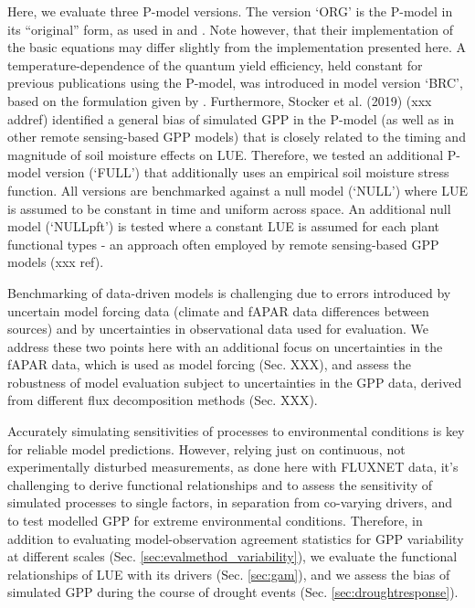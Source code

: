 \documentclass{myreport}
\begin{document}
Here, we evaluate three P-model versions. The version `ORG' is the P-model in its ``original'' form, as used in \cite{wang17natpl} and \cite{keenan17natcomm}. Note however, that their implementation of the basic equations may differ slightly from the implementation presented here. A temperature-dependence of the quantum yield efficiency, held constant for previous publications using the P-model, was introduced in model version `BRC', based on the formulation given by \cite{bernacchi03pce}. Furthermore, Stocker et al. (2019) (xxx addref) identified a general bias of simulated GPP in the P-model (as well as in other remote sensing-based GPP models) that is closely related to the timing and magnitude of soil moisture effects on LUE. Therefore, we tested an additional P-model version (`FULL') that additionally uses an empirical soil moisture stress function. All versions are benchmarked against a null model (`NULL') where LUE is assumed to be constant in time and uniform across space. An additional null model (`NULLpft') is tested where a constant LUE is assumed for each plant functional types - an approach often employed by remote sensing-based GPP models (xxx ref).

Benchmarking of data-driven models is challenging due to errors introduced by uncertain model forcing data \citep{ryu19rse} (climate and fAPAR data differences between sources) and by uncertainties in observational data used for evaluation. We address these two points here with an additional focus on uncertainties in the fAPAR data, which is used as model forcing (Sec. XXX), and assess the robustness of model evaluation subject to uncertainties in the GPP data, derived from different flux decomposition methods (Sec. XXX). 

Accurately simulating sensitivities of processes to environmental conditions is key for reliable model predictions. However, relying just on continuous, not experimentally disturbed measurements, as done here with FLUXNET data, it's challenging to derive functional relationships and to assess the sensitivity of simulated processes to single factors, in separation from co-varying drivers, and to test modelled GPP for extreme environmental conditions. Therefore, in addition to evaluating model-observation agreement statistics for GPP variability at different scales (Sec. \ref{sec:evalmethod_variability}), we evaluate the functional relationships of LUE with its drivers (Sec. \ref{sec:gam}), and we assess the bias of simulated GPP during the course of drought events (Sec. \ref{sec:droughtresponse}).
\end{document}
